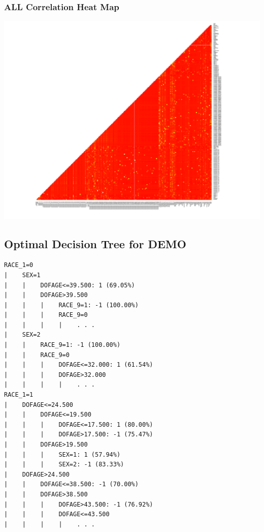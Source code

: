 \documentclass[11pt,letter]{article}
\begin{document}
\subsubsection{ALL Correlation Heat Map}
\includegraphics[scale=0.5]{report_figures/all.pdf}

\subsection{Optimal Decision Tree for DEMO} %
\begin{verbatim}
RACE_1=0
|    SEX=1
|    |    DOFAGE<=39.500: 1 (69.05%)
|    |    DOFAGE>39.500
|    |    |    RACE_9=1: -1 (100.00%)
|    |    |    RACE_9=0
|    |    |    |    . . .
|    SEX=2
|    |    RACE_9=1: -1 (100.00%)
|    |    RACE_9=0
|    |    |    DOFAGE<=32.000: 1 (61.54%)
|    |    |    DOFAGE>32.000
|    |    |    |    . . .
RACE_1=1
|    DOFAGE<=24.500
|    |    DOFAGE<=19.500
|    |    |    DOFAGE<=17.500: 1 (80.00%)
|    |    |    DOFAGE>17.500: -1 (75.47%)
|    |    DOFAGE>19.500
|    |    |    SEX=1: 1 (57.94%)
|    |    |    SEX=2: -1 (83.33%)
|    DOFAGE>24.500
|    |    DOFAGE<=38.500: -1 (70.00%)
|    |    DOFAGE>38.500
|    |    |    DOFAGE>43.500: -1 (76.92%)
|    |    |    DOFAGE<=43.500
|    |    |    |    . . .
\end{verbatim}
\end{document}
